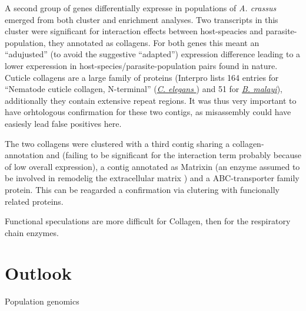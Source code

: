 A second group of genes differentially expresse in populations of
\textit{A. crassus} emerged from both cluster and enrichment
analyses. Two transcripts in this cluster were significant for
interaction effects between host-speacies and parasite-population,
they annotated as collagens. For both genes this meant an
``adujusted'' (to avoid the suggestive ``adapted'') expression
difference leading to a lower experession in
host-species/parasite-population pairs found in nature. Cuticle
collagens are a large family of proteins (Interpro lists 164 entries
for ``Nematode cuticle collagen, N-terminal''
(\href{http://www.ebi.ac.uk/interpro/ISpy?ipr=IPR002486&tax=6239}{\textit{C. elegans}
}) and 51 for
\href{http://www.ebi.ac.uk/interpro/ISpy?ipr=IPR002486&tax=6279}{\textit{B. malayi}}),
additionally they contain extensive repeat regions. It was thus very
important to have orhtologous confirmation for these two contigs, as
misassembly could have easiesly lead false positives here.

The two collagens were clustered with a third contig sharing a
collagen-annotation and (failing to be significant for the interaction
term probably because of low overall expression), a contig annotated
as Matrixin (an enzyme assumed to be involved in remodelig the
extracellular matrix \cite{mealloprot}) and a ABC-transporter family
protein. This can be reagarded a confirmation via clutering with
funcionally related proteins.

Functional speculations are more difficult for Collagen, then for the
respiratory chain enzymes. 


\section{Outlook}

Population genomics


